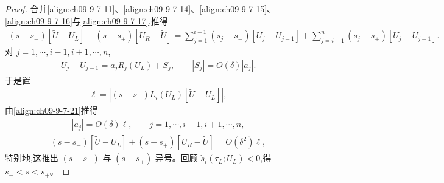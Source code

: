 \documentclass[../../main.tex]{subfiles}
\begin{document}
\begin{proof}
合并\eqref{align:ch09-9-7-11}、\eqref{align:ch09-9-7-14}、\eqref{align:ch09-9-7-15}、\eqref{align:ch09-9-7-16}与\eqref{align:ch09-9-7-17},推得
\begin{align}
(s-s_{-})[\tilde{U}-U_{L}]+(s-s_{+})[U_{R}-\tilde{U}]
=\sum_{j=1}^{i-1}(s_{j}-s_{-})[U_{j}-U_{j-1}]+\sum_{j=i+1}^{n}(s_{j}-s_{+})[U_{j}-U_{j-1}].
\label{align:ch09-9-7-21}
\end{align}
对 $j=1,\cdots ,i-1,i+1,\cdots ,n$,
\begin{align}
U_{j}-U_{j-1}=a_{j}R_{j}(U_{L})+S_{j},\qquad|S_{j}|=O(\delta)|a_{j}|.
\label{align:ch09-9-7-22}
\end{align}
于是置
\begin{align}
\ell=|(s-s_{-})L_{i}(U_{L})[\tilde{U}-U_{L}]|,
\label{align:ch09-9-7-23}
\end{align}
由\eqref{align:ch09-9-7-21}推得
\begin{align}
|a_{j}|=O(\delta)\ell,\qquad j=1,\cdots ,i-1,i+1,\cdots ,n,
\label{align:ch09-9-7-24}
\end{align}
\begin{align}
(s-s_{-})[\tilde{U}-U_{L}]+(s-s_{+})[U_{R}-\tilde{U}]=O(\delta^{2})\ell,
\label{align:ch09-9-7-25}
\end{align}
特别地,这推出 $(s-s_{-})$ 与 $(s-s_{+})$ 异号。回顾 $\dot{s}_{i}(\tau_{L};U_{L})<0$,得 $s_{-}<s<s_{+}$。


\end{proof}
\end{document}

